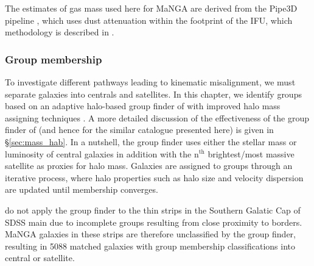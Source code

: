 The estimates of gas mass used here for MaNGA are derived from the Pipe3D pipeline \citep{pipe3Da, pipe3Dvac}, which uses dust attenuation within the footprint of the IFU, which methodology is described in \citet{barrera2018}.

\subsubsection{Group membership} \label{sec:group_def}
To investigate different pathways leading to kinematic misalignment, we must separate galaxies into centrals and satellites. In this chapter, we identify groups based on an adaptive halo-based group finder of \citet{yang2005,yang2007} with improved halo mass assigning techniques \citep[see;][for details and application to SDSS]{lim2017}. A more detailed discussion of the effectiveness of the group finder of \citep{yang2007} (and hence for the similar catalogue presented here) is given in \S\ref{sec:mass_hab}. In a nutshell, the group finder uses either the stellar mass or luminosity of central galaxies in addition with the $\mathrm{n^{th}}$ brightest/most massive satellite as proxies for halo mass. Galaxies are assigned to groups through an iterative process, where halo properties such as halo size and velocity dispersion are updated until membership converges. 

\citet{lim2017} do not apply the group finder to the thin strips in the Southern Galatic Cap of SDSS main due to incomplete groups resulting from close proximity to borders. MaNGA galaxies in these strips are therefore unclassified by the group finder, resulting in 5088 matched galaxies with group membership classifications into central or satellite. 


